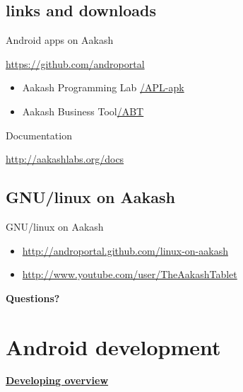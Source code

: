 \documentclass{beamer}
\begin{document}
 \subsection{links and downloads}
 \begin{frame}{Android apps on Aakash}
   \begin{block}{\url{https://github.com/androportal}}
     \begin{itemize}
       \item Aakash Programming Lab \hfill \url{/APL-apk}
       \item Aakash Business Tool\hfill \url{/ABT}
     \end{itemize}
   \end{block}
   \begin{block}{Documentation}
       \centerline{\url {http://aakashlabs.org/docs}}
   \end{block}
 \end{frame}

 \subsection{GNU/linux on Aakash}
 \begin{frame}{GNU/linux on Aakash}
   \begin{block}{}
     \begin{itemize}
     \item \url{http://androportal.github.com/linux-on-aakash}
     \item \url{http://www.youtube.com/user/TheAakashTablet}
     \end{itemize}
   \end{block}
 \end{frame}

 \begin{frame}{}
   \centerline{\bf Questions?}
 \end{frame}

 \section{Android development}

 \begin{frame}
 \begin{center}
   \centerline{\href{file:///home/sachin/github/slides/icfoss2013/developing_overview.svg}{\bf
   Developing overview}}
 \end{center}  
 \end{frame}
\end{document}
